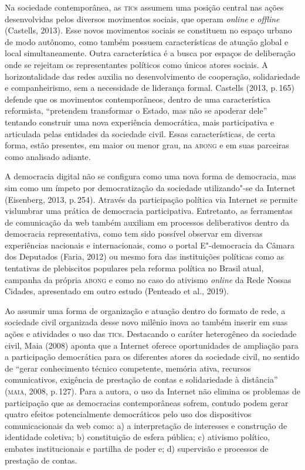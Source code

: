 Na sociedade contemporânea, as \textsc{tic}s assumem uma posição central nas
ações desenvolvidas pelos diversos movimentos sociais, que operam
\emph{online} e \emph{offline} (Castells, 2013). Esse novos movimentos sociais se
constituem no espaço urbano de modo autônomo, como também possuem
características de atuação global e local simultaneamente. Outra
característica é a busca por espaços de deliberação onde se rejeitam os
representantes políticos como únicos atores sociais. A horizontalidade
das redes auxilia no desenvolvimento de cooperação, solidariedade e
companheirismo, sem a necessidade de liderança formal. Castells (2013,
p.\,165) defende que os movimentos contemporâneos, dentro de uma
característica reformista, ``pretendem transformar o Estado, mas não se
apoderar dele'' tentando construir uma nova experiência democrática, mais
participativa e articulada pelas entidades da sociedade civil. Essas
características, de certa forma, estão presentes, em maior ou menor
grau, na \textsc{abong} e em suas parceiras como analisado adiante.

A democracia digital não se configura como uma nova forma de democracia,
mas sim como um ímpeto por democratização da sociedade utilizando"-se da
Internet (Eisenberg, 2013, p.\,254). Através da participação política via
Internet se permite vislumbrar uma prática de democracia participativa.
Entretanto, as ferramentas de comunicação da web também auxiliam em
processos deliberativos dentro da democracia representativa, como tem
sido possível observar em diversas experiências nacionais e
internacionais, como o portal E"-democracia da Câmara dos Deputados
(Faria, 2012) ou mesmo fora das instituições políticas como as
tentativas de plebiscitos populares pela reforma política no Brasil
atual, campanha da própria \textsc{abong} e como no caso do ativismo \emph{online} da
Rede Nossas Cidades, apresentado em outro estudo (Penteado et al.,
2019).

Ao assumir uma forma de organização e atuação dentro do formato de rede,
a sociedade civil organizada desse novo milênio inova ao também inserir
em suas ações e atividades o uso das \textsc{tic}s. Destacando o caráter
heterogêneo da sociedade civil, Maia (2008) aponta que a Internet
oferece oportunidades de ampliação para a participação democrática para
os diferentes atores da sociedade civil, no sentido de ``gerar
conhecimento técnico competente, memória ativa, recursos comunicativos,
exigência de prestação de contas e solidariedade à distância'' (\textsc{maia},
2008, p.\,127). Para a autora, o uso da Internet não elimina os problemas
de participação que as democracias contemporâneas sofrem, contudo podem
gerar quatro efeitos potencialmente democráticos pelo uso dos
dispositivos comunicacionais da web como: a) a interpretação de
interesses e construção de identidade coletiva; b) constituição de
esfera pública; c) ativismo político, embates institucionais e partilha
de poder e; d) supervisão e processos de prestação de contas.

